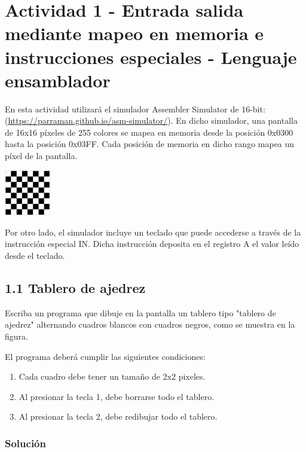 \documentclass{article}
\begin{document}



\section*{Actividad 1 - Entrada salida mediante mapeo en memoria e instrucciones especiales - Lenguaje ensamblador}

En esta actividad utilizará el simulador Assembler Simulator de 16-bit: (\url{https://parraman.github.io/asm-simulator/}). En dicho simulador, una pantalla de 16x16 píxeles de 255 colores se mapea en memoria desde la posición 0x0300 hasta la posición 0x03FF. Cada posición de memoria en dicho rango mapea un píxel de la pantalla.

\begin{center}
    \includegraphics*[width=76px]{./img/ej1.1.png}
\end{center}

Por otro lado, el simulador incluye un teclado que puede accederse a través de la instrucción especial IN. Dicha instrucción deposita en el registro A el valor leído desde el teclado.


\subsection*{1.1 Tablero de ajedrez}

Escriba un programa que dibuje en la pantalla un tablero tipo "tablero de ajedrez" alternando cuadros blancos con cuadros negros, como se muestra en la figura.

El programa deberá cumplir las siguientes condiciones:

\begin{enumerate}[label=\alph*)]
    \item Cada cuadro debe tener un tamaño de 2x2 pixeles.
    \item Al presionar la tecla 1, debe borrarse todo el tablero.
    \item Al presionar la tecla 2, debe redibujar todo el tablero.
\end{enumerate}

\subsubsection*{Solución}
\end{document}
